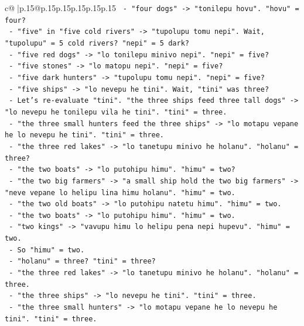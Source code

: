 \documentclass{article}
\begin{document}
{\begin{supertabular}{c@{$\;$}|p{.15\linewidth}@{}p{.15\linewidth}p{.15\linewidth}p{.15\linewidth}p{.15\linewidth}p{.15\linewidth}}
{{{\texttt{          {-} "four dogs" {-}> "tonilepu hovu". "hovu" = four?} \\
\texttt{          {-} "five" in "five cold rivers" {-}> "tupolupu tomu nepi". Wait, "tupolupu" = 5 cold rivers? "nepi" = 5 dark?} \\
\texttt{          {-} "five red dogs" {-}> "lo tonilepu minivo nepi". "nepi" = five?} \\
\texttt{          {-} "five stones" {-}> "lo matopu nepi". "nepi" = five?} \\
\texttt{          {-} "five dark hunters" {-}> "tupolupu tomu nepi". "nepi" = five?} \\
\texttt{          {-} "five ships" {-}> "lo nevepu he tini". Wait, "tini" was three?} \\
\texttt{          {-} Let's re{-}evaluate "tini". "the three ships feed three tall dogs" {-}> "lo nevepu he tonilepu vila he tini". "tini" = three.} \\
\texttt{          {-} "the three small hunters feed the three ships" {-}> "lo motapu vepane he lo nevepu he tini". "tini" = three.} \\
\texttt{          {-} "the three red lakes" {-}> "lo tanetupu minivo he holanu". "holanu" = three?} \\
\texttt{          {-} "the two boats" {-}> "lo putohipu himu". "himu" = two?} \\
\texttt{          {-} "the two big farmers" {-}> "a small ship hold the two big farmers" {-}> "neve vepane lo helipu lina himu holanu". "himu" = two.} \\
\texttt{          {-} "the two old boats" {-}> "lo putohipu natetu himu". "himu" = two.} \\
\texttt{          {-} "the two boats" {-}> "lo putohipu himu". "himu" = two.} \\
\texttt{          {-} "two kings" {-}> "vavupu himu lo helipu pena nepi hupevu". "himu" = two.} \\
\texttt{          {-} So "himu" = two.} \\
\texttt{          {-} "holanu" = three? "tini" = three?} \\
\texttt{          {-} "the three red lakes" {-}> "lo tanetupu minivo he holanu". "holanu" = three.} \\
\texttt{          {-} "the three ships" {-}> "lo nevepu he tini". "tini" = three.} \\
\texttt{          {-} "the three small hunters" {-}> "lo motapu vepane he lo nevepu he tini". "tini" = three.} \\
}}}
\end{supertabular}}
\end{document}
